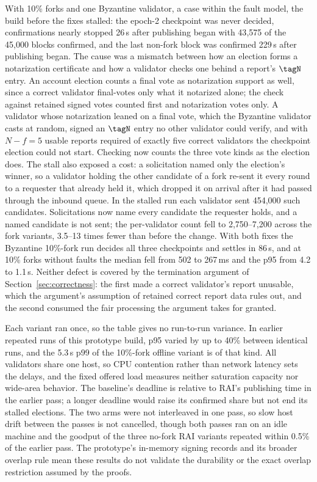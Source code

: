 With 10\% forks and one Byzantine validator, a case within the fault model, the build before the fixes stalled: the epoch-2 checkpoint was never decided, confirmations nearly stopped 26\,s after publishing began with 43{,}575 of the 45{,}000 blocks confirmed, and the last non-fork block was confirmed 229\,s after publishing began. The cause was a mismatch between how an election forms a notarization certificate and how a validator checks one behind a report's $\tagN$ entry. An account election counts a final vote as notarization support as well, since a correct validator final-votes only what it notarized alone; the check against retained signed votes counted first and notarization votes only. A validator whose notarization leaned on a final vote, which the Byzantine validator casts at random, signed an $\tagN$ entry no other validator could verify, and with $N-f=5$ usable reports required of exactly five correct validators the checkpoint election could not start. Checking now counts the three vote kinds as the election does. The stall also exposed a cost: a solicitation named only the election's winner, so a validator holding the other candidate of a fork re-sent it every round to a requester that already held it, which dropped it on arrival after it had passed through the inbound queue. In the stalled run each validator sent 454{,}000 such candidates. Solicitations now name every candidate the requester holds, and a named candidate is not sent; the per-validator count fell to 2{,}750--7{,}200 across the fork variants, 3.5--13 times fewer than before the change. With both fixes the Byzantine 10\%-fork run decides all three checkpoints and settles in 86\,s, and at 10\% forks without faults the median fell from 502 to 267\,ms and the p95 from 4.2 to 1.1\,s. Neither defect is covered by the termination argument of Section~\ref{sec:correctness}: the first made a correct validator's report unusable, which the argument's assumption of retained correct report data rules out, and the second consumed the fair processing the argument takes for granted.

Each variant ran once, so the table gives no run-to-run variance. In earlier repeated runs of this prototype build, p95 varied by up to 40\% between identical runs, and the 5.3\,s p99 of the 10\%-fork offline variant is of that kind. All validators share one host, so CPU contention rather than network latency sets the delays, and the fixed offered load measures neither saturation capacity nor wide-area behavior. The baseline's deadline is relative to RAI's publishing time in the earlier pass; a longer deadline would raise its confirmed share but not end its stalled elections. The two arms were not interleaved in one pass, so slow host drift between the passes is not cancelled, though both passes ran on an idle machine and the goodput of the three no-fork RAI variants repeated within 0.5\% of the earlier pass. The prototype's in-memory signing records and its broader overlap rule mean these results do not validate the durability or the exact overlap restriction assumed by the proofs.

